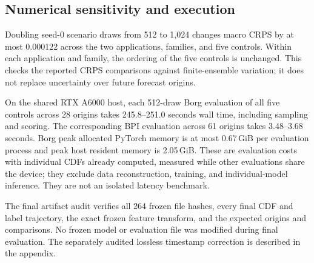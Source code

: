 \subsection{Numerical sensitivity and execution}
Doubling seed-0 scenario draws from 512 to 1,024 changes macro CRPS by at
most 0.000122 across the two applications, families, and five controls.
Within each application and family, the ordering of the five controls is
unchanged. This checks the reported CRPS comparisons against finite-ensemble
variation; it does not replace uncertainty over future forecast origins.

On the shared RTX A6000 host, each 512-draw Borg evaluation of all five
controls across 28 origins takes 245.8--251.0
seconds wall time, including sampling and scoring. The corresponding BPI
evaluation across 61 origins takes 3.48--3.68
seconds. Borg peak allocated PyTorch memory is at most 0.67\,GiB
per evaluation process and peak host resident memory is 2.05\,GiB.
These are evaluation costs with individual CDFs already computed, measured
while other evaluations share the device; they exclude data reconstruction,
training, and individual-model inference. They are not an isolated latency
benchmark.

The final artifact audit verifies all 264 frozen
file hashes, every final CDF and label trajectory, the exact frozen feature
transform, and the expected origins and comparisons. No frozen model or
evaluation file was modified during final evaluation. The separately audited
lossless timestamp correction is described in the appendix.
